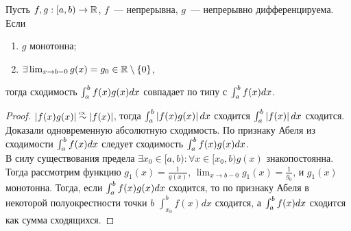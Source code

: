 \documentclass[../main.tex]{subfiles}
\begin{document}
  
  \begin{corollary}
    Пусть $f,g: [a,b) \to \mathbb{R}$, $f$~--- непрерывна, $g$~--- непрерывно дифференцируема. Если
    \begin{enumerate}
      \item $g$ монотонна;
      \item $\exists \lim_{x \to b-0} g(x)  = g_0 \in \mathbb{R} \setminus \{ 0 \} $,
    \end{enumerate}
    тогда сходимость $\int_a^b f(x) g(x) dx$ совпадает по типу с $\int_a^b f(x) dx$.
  \end{corollary}

  
  \begin{proof}
    $ \left| f(x) g(x)  \right| \eqincon \left| f(x)  \right| $, тогда $\int_a^b \left| f(x)  g(x)  \right| dx$ сходится \nas $\int_a^b \left| f(x)  \right| dx$ сходится. Доказали одновременную абсолютную сходимость. По признаку Абеля из сходимости $\int_a^b f(x) dx$ следует сходимость $\int_a^b f(x) g(x) dx$. \\
    В силу существования предела $\exists x_0 \in [a, b) : \forall x \in [x_0,b) g(x)$ знакопостоянна. Тогда рассмотрим функцию $g_1 (x) = \frac{1}{g(x)}$, $\lim_{x \to b-0} g_1 (x) = \frac{1}{g_0 }$, и $g_1 (x)$ монотонна. Тогда, если $\int_a^b f(x) g(x) dx$ сходится, то по признаку Абеля в некоторой полуокрестности точки $b$ $\int_{x_0 }^{b} f(x)dx$ сходится, а $\int_a^b f(x) dx$ сходится как сумма сходящихся. 
  \end{proof}
  
\end{document}
